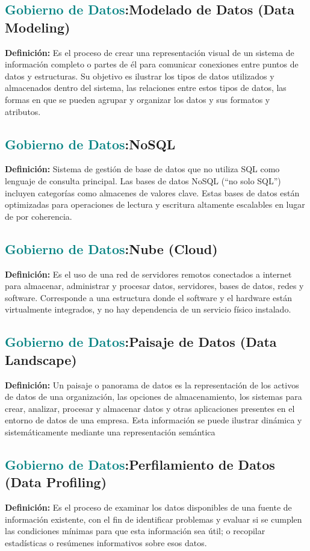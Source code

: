 \documentclass[12pt]{article}
\begin{document}
\subsection{\textcolor{teal}{Gobierno de Datos}:{Modelado de Datos (Data Modeling)}}
\textbf{Definición:} Es el proceso de crear una representación visual de un sistema de información completo o partes de él para comunicar conexiones entre puntos de datos y estructuras. Su objetivo es ilustrar los tipos de datos utilizados y almacenados dentro del sistema, las relaciones entre estos tipos de datos, las formas en que se pueden agrupar y organizar los datos y sus formatos y atributos.
\subsection{\textcolor{teal}{Gobierno de Datos}:{NoSQL}}
\textbf{Definición:} Sistema de gestión de base de datos que no utiliza SQL como lenguaje de consulta principal. Las bases de datos NoSQL (“no solo SQL”) incluyen categorías como almacenes de valores clave. Estas bases de datos están optimizadas para operaciones de lectura y escritura altamente escalables en lugar de por coherencia.
\subsection{\textcolor{teal}{Gobierno de Datos}:{Nube (Cloud)}}
\textbf{Definición:} Es el uso de una red de servidores remotos conectados a internet para almacenar, administrar y procesar datos, servidores, bases de datos, redes y software. Corresponde a una estructura donde el software y el hardware están virtualmente integrados, y no hay dependencia de un servicio físico instalado.
\subsection{\textcolor{teal}{Gobierno de Datos}:{Paisaje de Datos (Data Landscape)}}
\textbf{Definición:} Un paisaje o panorama de datos es la representación de los activos de datos de una organización, las opciones de almacenamiento, los sistemas para crear, analizar, procesar y almacenar datos y otras aplicaciones presentes en el entorno de datos de una empresa. Esta información se puede ilustrar dinámica y sistemáticamente mediante una representación semántica

\subsection{\textcolor{teal}{Gobierno de Datos}:{Perfilamiento de Datos (Data Profiling)}}
\textbf{Definición:} Es el proceso de examinar los datos disponibles de una fuente de información existente, con el fin de identificar problemas y evaluar si se cumplen las condiciones mínimas para que esta información sea útil; o recopilar estadísticas o resúmenes informativos sobre esos datos.
\end{document}
